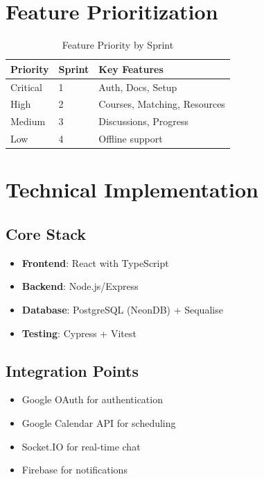 \section{Feature Prioritization}
\begin{table}[h]
\centering
\caption{Feature Priority by Sprint}
\begin{tabular}{|l|l|l|}
\hline
\textbf{Priority} & \textbf{Sprint} & \textbf{Key Features} \\ \hline
Critical & 1 & Auth, Docs, Setup \\ \hline
High & 2 & Courses, Matching, Resources \\ \hline
Medium & 3 & Discussions, Progress \\ \hline
Low & 4 & Offline support \\ \hline
\end{tabular}
\end{table}

\section{Technical Implementation}
\subsection{Core Stack}
\begin{itemize}
    \item \textbf{Frontend}: React with TypeScript
    \item \textbf{Backend}: Node.js/Express
    \item \textbf{Database}: PostgreSQL (NeonDB) + Sequalise
    \item \textbf{Testing}: Cypress + Vitest
\end{itemize}

\subsection{Integration Points}
\begin{itemize}
    \item Google OAuth for authentication
    \item Google Calendar API for scheduling
    \item Socket.IO for real-time chat
    \item Firebase for notifications
\end{itemize}

